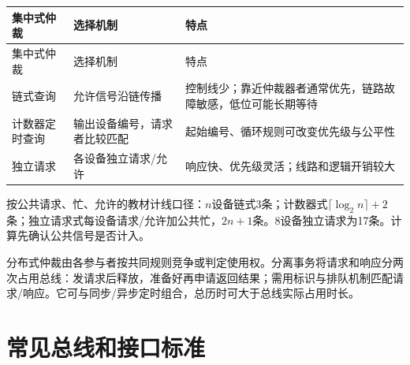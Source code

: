 \par\smallskip
\begin{wideblock}
{\fontsize{9.3}{12}\selectfont\setlength{\tabcolsep}{2.5pt}\setlength{\LTleft}{0pt}\setlength{\LTright}{0pt}
\begin{longtable}{@{}>{\raggedright\arraybackslash}p{}>{\raggedright\arraybackslash}p{}>{\raggedright\arraybackslash}p{}@{}}
\toprule
集中式仲裁 & 选择机制 & 特点 \\

\midrule\endfirsthead\toprule
集中式仲裁 & 选择机制 & 特点 \\

\midrule\endhead\bottomrule\endfoot
链式查询 & 允许信号沿链传播 & 控制线少；靠近仲裁器者通常优先，链路故障敏感，低位可能长期等待 \\

计数器定时查询 & 输出设备编号，请求者比较匹配 & 起始编号、循环规则可改变优先级与公平性 \\

独立请求 & 各设备独立请求/允许 & 响应快、优先级灵活；线路和逻辑开销较大 \\

\end{longtable}}
\end{wideblock}
\par\smallskip

按公共请求、忙、允许的教材计线口径：\(n\)设备链式3条；计数器式\(\lceil\log_2n\rceil+2\)条；独立请求式每设备请求/允许加公共忙，\(2n+1\)条。8设备独立请求为17条。计算先确认公共信号是否计入。

分布式仲裁由各参与者按共同规则竞争或判定使用权。分离事务将请求和响应分两次占用总线：发请求后释放，准备好再申请返回结果；需用标识与排队机制匹配请求/响应。它可与同步/异步定时组合，总历时可大于总线实际占用时长。

\section{常见总线和接口标准}\label{CO06-standards}

